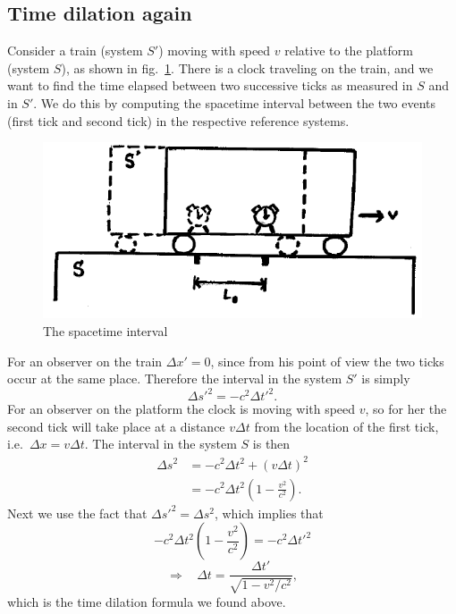 \subsection{Time dilation again}

Consider a train (system $S'$) moving with speed $v$ relative to the platform (system $S$), as shown in fig.\ \ref{fig:lec2_5}. There is a clock traveling on the train, and we want to find the time elapsed between two successive ticks as measured in $S$ and in $S'$. We do this by computing the spacetime interval between the two events (first tick and second tick) in the respective reference systems.
\begin{figure}[ht]
\begin{center}
\includegraphics[scale=0.6]{Draw/lec2_5.png}
\end{center}
\caption{The spacetime interval}
\label{fig:lec2_5}
\end{figure}

For an observer on the train $\Delta x'=0$, since from his point of view the two ticks occur at the same place. Therefore the interval in the system $S'$ is simply
\begin{equation}
\Delta s'^2=-c^2\Delta t'^2.
\end{equation}
For an observer on the platform the clock is moving with speed $v$, so for her the second tick will take place at a distance $v\Delta t$ from the location of the first tick, i.e.\ $\Delta x=v\Delta t$. The interval in the system $S$ is then
\begin{equation}
\begin{split}
\Delta s^2&=-c^2\Delta t^2+(v\Delta t)^2\\
&=-c^2\Delta t^2\left(1-\frac{v^2}{c^2}\right).
\end{split}
\end{equation}
Next we use the fact that $\Delta s'^2=\Delta s^2$, which implies that
\begin{equation}
-c^2\Delta t^2\left(1-\frac{v^2}{c^2}\right)=-c^2\Delta t'^2
\end{equation}
\begin{equation}
\Rightarrow~~~~\Delta t=\frac{\Delta t'}{\sqrt{1-v^2/c^2}},
\end{equation}
which is the time dilation formula we found above.

